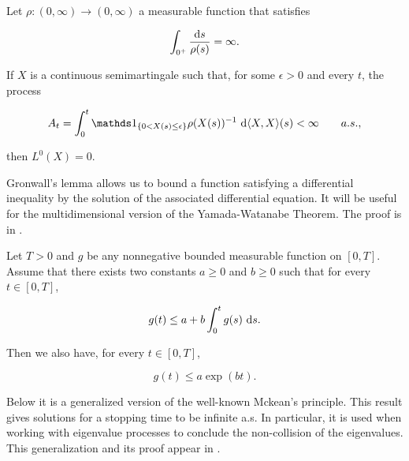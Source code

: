\begin{theorem} \label{thm:local_zero} 
    Let  $\rho : (0,\infty) \to (0,\infty)$ a measurable function that satisfies 

    \begin{equation*}
        \int_{0^+} \frac{\mathrm d s}{\rho(s)} = \infty.
    \end{equation*}


    If $X$ is a continuous semimartingale such that, for some $\epsilon > 0$ and every $t$, the process

    \begin{equation*}
        A_t = \int_0^t \mathds 1_{\{0 < X(s) \le \epsilon\}} \rho(X(s))^{-1} ~\d \langle X, X \rangle (s) < \infty \qquad a.s.,
    \end{equation*}

    \noindent then $L^0(X) = 0$.
\end{theorem}

Gronwall's lemma allows us to bound a function satisfying a differential inequality by the solution of the associated differential equation. It will be useful for the multidimensional version of the Yamada-Watanabe Theorem. The proof is in \cite[page 213]{book:legall}.


\begin{lemma} 
    \label{lemma:gronwall} %
    Let $T >0$ and $g$ be any nonnegative bounded measurable function on $[0,T]$. Assume that there exists two constants $a\ge 0$ and $b\ge 0$ such that for every $t\in [0,T]$,

    \[ g(t) \le a + b\int_0^t g(s)~\mathrm d s. \]

    Then we also have, for every $t \in [0,T]$,

    \[ g(t) \le a \exp(bt). \]
\end{lemma}

Below it is a generalized version of the well-known Mckean's principle. This result gives solutions for a stopping time to be infinite a.s. In particular, it is used when working with eigenvalue processes to conclude the non-collision of the eigenvalues. This generalization and its proof appear in \cite{mayerhofer2011strong}.

